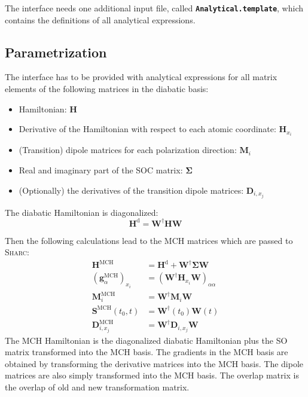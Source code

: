 \documentclass[a4paper,10pt,DIV=15,openany,twoside=false]{scrbook}
\newcommand{\sharc}{\textsc{Sharc}}
\newcommand{\ttt}[1]{\textbf{\texttt{#1}}}
\begin{document}
The interface needs one additional input file, called \ttt{Analytical.template}, which contains the definitions of all analytical expressions.

\subsection{Parametrization}

The interface has to be provided with analytical expressions for all matrix elements of the following matrices in the diabatic basis:
\begin{itemize}
  \item Hamiltonian: $\mathbf{H}$
  \item Derivative of the Hamiltonian with respect to each atomic coordinate: $\mathbf{H}_{x_i}$
  \item (Transition) dipole matrices for each polarization direction: $\mathbf{M}_i$
  \item Real and imaginary part of the SOC matrix: $\boldsymbol{\Sigma}$
  \item (Optionally) the derivatives of the transition dipole matrices: $\mathbf{D}_{i,x_j}$
\end{itemize}

The diabatic Hamiltonian is diagonalized:
\begin{equation}
  \mathbf{H}^{\text{d}}=\mathbf{W}^\dagger\mathbf{H}\mathbf{W}
\end{equation}


Then the following calculations lead to the MCH matrices which are passed to \sharc:
\begin{align}
  \mathbf{H}^{\text{MCH}}&=\mathbf{H}^{\text{d}}+\mathbf{W}^\dagger\boldsymbol{\Sigma}\mathbf{W}\\
  \left(\mathbf{g}^{\text{MCH}}_\alpha\right)_{x_i}&=\left(\mathbf{W}^\dagger\mathbf{H}_{x_i}\mathbf{W}\right)_{\alpha\alpha}\\
  \mathbf{M}^{\text{MCH}}_i&=\mathbf{W}^\dagger\mathbf{M}_i\mathbf{W}\\
  \mathbf{S}^{\text{MCH}}(t_0,t)&=\mathbf{W}^\dagger(t_0)\mathbf{W}(t)\\
  \mathbf{D}^{\text{MCH}}_{i,x_j}&=\mathbf{W}^\dagger\mathbf{D}_{i,x_j}\mathbf{W}
\end{align}
The MCH Hamiltonian is the diagonalized diabatic Hamiltonian plus the SO matrix transformed into the MCH basis. The gradients in the MCH basis are obtained by transforming the derivative matrices into the MCH basis. The dipole matrices are also simply transformed into the MCH basis. The overlap matrix is the overlap of old and new transformation matrix.
\end{document}
